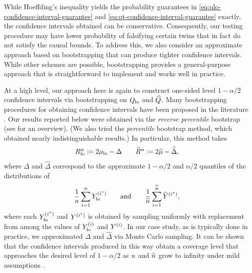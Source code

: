 While Hoeffding's inequality yields the probability guarantees in \eqref{eq:qlo-confidence-interval-guarantee} and \eqref{eq:qt-confidence-interval-guarantee} exactly, the confidence intervals obtained can be conservative.
Consequently, our testing procedure may have lower probability of falsifying certain twins that in fact do not satisfy the causal bounds.
To address this, we also consider an approximate approach based on bootstrapping that can produce tighter confidence intervals.
While other schemes are possible, bootstrapping provides a general-purpose approach that is straightforward to implement and works well in practice.

At a high level, our approach here is again to construct one-sided level $1 - \alpha/2$ confidence intervals via bootstrapping \citep{efron1979bootstrap} on $Q_{\mathrm{lo}}$ and $\widehat{Q}$.
Many bootstrapping procedures for obtaining confidence intervals have been proposed in the literature \citep{tibshirani1993introduction,davison1997bootstrap,hesterberg2015what}. 
Our results reported below were obtained via the \emph{reverse percentile} bootstrap (see \cite{hesterberg2015what} for an overview).
(We also tried the \emph{percentile} bootstrap method, which obtained nearly indistinguishable results.)
In particular, this method takes
\[
    R_{\mathrm{lo}}^{\alpha} \coloneqq 2 {\mu_{\mathrm{lo}}} - \Delta 
    \qquad \widehat{R}^{\alpha} \coloneqq 2 \widehat{\mu} - \widehat{\Delta},
\]
where $\Delta$ and $\widehat{\Delta}$ correspond to the approximate $1 - \alpha / 2$ and $\alpha / 2$ quantiles of the distributions of 
\[
    \frac{1}{n} \sum_{i=1}^{n} Y_{\mathrm{lo}}^{(i^\ast)} 
    \qquad\text{and}\qquad
    \frac{1}{\widehat{n}} \sum_{i=1}^{\widehat{n}} \widehat{Y}^{(i^\ast)},
\]
where each $Y_{\mathrm{lo}}^{(i^\ast)}$ and $Y^{(i^\ast)}$ is obtained by sampling uniformly with replacement from among the values of $Y_{\mathrm{lo}}^{(i)}$ and $Y^{(i)}$.
In our case study, as is typically done in practice, we approximated $\Delta$ and $\widehat{\Delta}$ via Monte Carlo sampling.
It can be shown that the confidence intervals produced in this way obtain a coverage level that approaches the desired level of $1 - \alpha/2$ as $n$ and $\widehat{n}$ grow to infinity under mild assumptions \citep{hall1988theoretical}.

